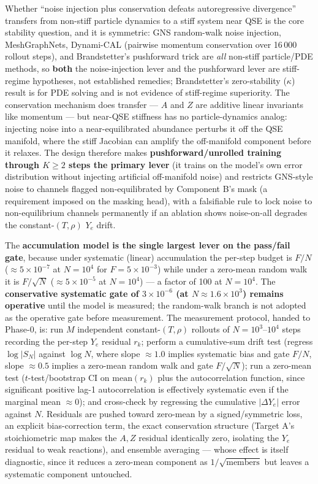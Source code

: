 \documentclass[11pt]{article}
\newcommand{\Ye}{Y_{e}}
\newcommand{\dYe}{\Delta Y_{e}}
\begin{document}
Whether ``noise injection plus conservation defeats autoregressive divergence'' transfers from non-stiff particle dynamics to a stiff system near QSE is the core stability question, and it is symmetric: GNS random-walk noise injection, MeshGraphNets, Dynami-CAL (pairwise momentum conservation over 16\,000 rollout steps), and Brandstetter's pushforward trick are \emph{all} non-stiff particle/PDE methods, so \textbf{both} the noise-injection lever and the pushforward lever are stiff-regime hypotheses, not established remedies; Brandstetter's zero-stability ($\kappa$) result is for PDE solving and is not evidence of stiff-regime superiority. The conservation mechanism does transfer --- $A$ and $Z$ are additive linear invariants like momentum --- but near-QSE stiffness has no particle-dynamics analog: injecting noise into a near-equilibrated abundance perturbs it off the QSE manifold, where the stiff Jacobian can amplify the off-manifold component before it relaxes. The design therefore makes \textbf{pushforward/unrolled training through $K \ge 2$ steps the primary lever} (it trains on the model's own error distribution without injecting artificial off-manifold noise) and restricts GNS-style noise to channels flagged non-equilibrated by Component B's mask (a requirement imposed on the masking head), with a falsifiable rule to lock noise to non-equilibrium channels permanently if an ablation shows noise-on-all degrades the constant-$(T,\rho)$ $\Ye$ drift.

The \textbf{accumulation model is the single largest lever on the pass/fail gate}, because under systematic (linear) accumulation the per-step budget is $F/N$ ($\approx 5\times10^{-7}$ at $N = 10^{4}$ for $F = 5\times10^{-3}$) while under a zero-mean random walk it is $F/\sqrt{N}$ ($\approx 5\times10^{-5}$ at $N = 10^{4}$) --- a factor of 100 at $N = 10^{4}$. The \textbf{conservative systematic gate of $3\times10^{-6}$ (at $N \approx 1.6\times10^{3}$) remains operative} until the model is measured; the random-walk branch is not adopted as the operative gate before measurement. The measurement protocol, handed to Phase-0, is: run $M$ independent constant-$(T,\rho)$ rollouts of $N = 10^{3}$--$10^{4}$ steps recording the per-step $\Ye$ residual $r_k$; perform a cumulative-sum drift test (regress $\log|S_N|$ against $\log N$, where slope $\approx 1.0$ implies systematic bias and gate $F/N$, slope $\approx 0.5$ implies a zero-mean random walk and gate $F/\sqrt{N}$); run a zero-mean test ($t$-test/bootstrap CI on $\mathrm{mean}(r_k)$ plus the autocorrelation function, since significant positive lag-1 autocorrelation is effectively systematic even if the marginal mean $\approx 0$); and cross-check by regressing the cumulative $|\dYe|$ error against $N$. Residuals are pushed toward zero-mean by a signed/symmetric loss, an explicit bias-correction term, the exact conservation structure (Target A's stoichiometric map makes the $A,Z$ residual identically zero, isolating the $\Ye$ residual to weak reactions), and ensemble averaging --- whose effect is itself diagnostic, since it reduces a zero-mean component as $1/\sqrt{\text{members}}$ but leaves a systematic component untouched.
\end{document}
